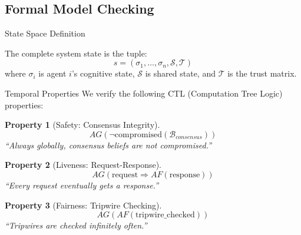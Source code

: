 \documentclass[
  ignorenonframetext,
]{beamer}
\newtheorem{property}{Property}
\begin{document}
\subsection{Formal Model Checking}\label{sec:model-checking}

\begin{frame}[allowframebreaks]{State Space Definition}
\protect{}\label{sec:state-space}
\begin{definition}
\label{def:system-state-verification}
The complete system state is the tuple:
\begin{equation}
\label{eq:system-state-verification}
s = (\sigma_1, \ldots, \sigma_n, \mathcal{S}, \mathcal{T})
\end{equation}
where $\sigma_i$ is agent $i$'s cognitive state, $\mathcal{S}$ is shared state, and $\mathcal{T}$ is the trust matrix.
\end{definition}
\end{frame}

\begin{frame}[allowframebreaks]{Temporal Properties}
\protect{}\label{sec:temporal-properties}
We verify the following CTL (Computation Tree Logic) properties:

\begin{property}[Safety: Consensus Integrity]
\label{prop:ctl-safety}
\begin{equation}
\label{eq:ctl-safety}
AG(\neg \text{compromised}(\mathcal{B}_{consensus}))
\end{equation}
``Always globally, consensus beliefs are not compromised.''
\end{property}

\begin{property}[Liveness: Request-Response]
\label{prop:ctl-liveness}
\begin{equation}
\label{eq:ctl-liveness}
AG(\text{request} \Rightarrow AF(\text{response}))
\end{equation}
``Every request eventually gets a response.''
\end{property}

\begin{property}[Fairness: Tripwire Checking]
\label{prop:ctl-fairness}
\begin{equation}
\label{eq:ctl-fairness}
AG(AF(\text{tripwire\_checked}))
\end{equation}
``Tripwires are checked infinitely often.''
\end{property}
\end{frame}
\end{document}
